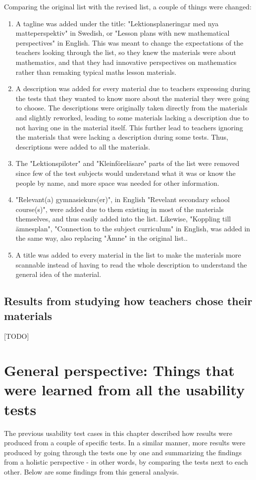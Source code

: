 Comparing the original list with the revised list, a couple of things were changed:
\begin{enumerate}
	\item A tagline was added under the title: "Lektionsplaneringar med nya matteperspektiv" in Swedish, or "Lesson plans with new mathematical perspectives" in English. This was meant to change the expectations of the teachers looking through the list, so they knew the materials were about mathematics, and that they had innovative perspectives on mathematics rather than remaking typical maths lesson materials.
	\item A description was added for every material due to teachers expressing during the tests that they wanted to know more about the material they were going to choose. The descriptions were originally taken directly from the materials and slightly reworked, leading to some materials lacking a description due to not having one in the material itself. This further lead to teachers ignoring the materials that were lacking a description during some tests. Thus, descriptions were added to all the materials.
	\item The "Lektionspiloter" and "Kleinföreläsare" parts of the list were removed since few of the test subjects would understand what it was or know the people by name, and more space was needed for other information.
	\item "Relevant(a) gymnasiekurs(er)", in English "Revelant secondary school course(s)", were added due to them existing in most of the materials themselves, and thus easily added into the list. Likewise, "Koppling till ämnesplan", "Connection to the subject curriculum" in English, was added in the same way, also replacing "Ämne" in the original list..
	\item A title was added to every material in the list to make the materials more scannable instead of having to read the whole description to understand the general idea of the material.
\end{enumerate}

\subsection{Results from studying how teachers chose their materials}

[TODO]

\section{General perspective: Things that were learned from all the usability tests}
The previous usability test cases in this chapter described how results were produced from a couple of specific tests. In a similar manner, more results were produced by going through the tests one by one and summarizing the findings from a holistic perspective - in other words, by comparing the tests next to each other. Below are some findings from this general analysis.

